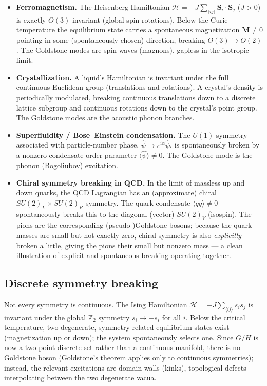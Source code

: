 \documentclass[11pt]{article}
\theoremstyle{definition}
\theoremstyle{remark}
\newcommand{\ii}{\mathrm{i}}
\newcommand{\Ham}{\mathcal{H}}
\begin{document}
\begin{itemize}
\item \textbf{Ferromagnetism.} The Heisenberg Hamiltonian $\Ham = -J\sum_{\langle ij\rangle}\bm S_i\!\cdot\!\bm S_j$ ($J>0$) is exactly $O(3)$-invariant (global spin rotations). Below the Curie temperature the equilibrium state carries a spontaneous magnetization $\bm M\neq0$ pointing in some (spontaneously chosen) direction, breaking $O(3)\to O(2)$. The Goldstone modes are spin waves (magnons), gapless in the isotropic limit.

\item \textbf{Crystallization.} A liquid's Hamiltonian is invariant under the full continuous Euclidean group (translations and rotations). A crystal's density is periodically modulated, breaking continuous translations down to a discrete lattice subgroup and continuous rotations down to the crystal's point group. The Goldstone modes are the acoustic phonon branches.

\item \textbf{Superfluidity / Bose--Einstein condensation.} The $U(1)$ symmetry associated with particle-number phase, $\hat\psi \to e^{\ii\alpha}\hat\psi$, is spontaneously broken by a nonzero condensate order parameter $\langle\hat\psi\rangle\neq0$. The Goldstone mode is the phonon (Bogoliubov) excitation.

\item \textbf{Chiral symmetry breaking in QCD.} In the limit of massless up and down quarks, the QCD Lagrangian has an (approximate) chiral $SU(2)_L\times SU(2)_R$ symmetry. The quark condensate $\langle\bar q q\rangle\neq0$ spontaneously breaks this to the diagonal (vector) $SU(2)_V$ (isospin). The pions are the corresponding (pseudo-)Goldstone bosons; because the quark masses are small but not exactly zero, chiral symmetry is also \emph{explicitly} broken a little, giving the pions their small but nonzero mass — a clean illustration of explicit and spontaneous breaking operating together.
\end{itemize}

\subsection{Discrete symmetry breaking}

Not every symmetry is continuous. The Ising Hamiltonian $\Ham=-J\sum_{\langle ij\rangle}s_is_j$ is invariant under the global $\mathbb Z_2$ symmetry $s_i\to -s_i$ for all $i$. Below the critical temperature, two degenerate, symmetry-related equilibrium states exist (magnetization up or down); the system spontaneously selects one. Since $G/H$ is now a two-point discrete set rather than a continuous manifold, there is no Goldstone boson (Goldstone's theorem applies only to continuous symmetries); instead, the relevant excitations are domain walls (kinks), topological defects interpolating between the two degenerate vacua.
\end{document}
